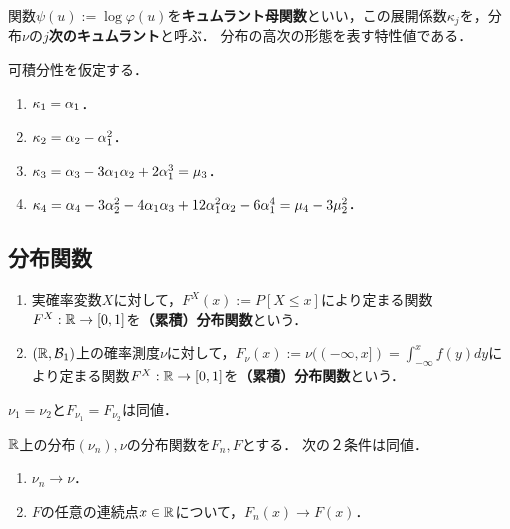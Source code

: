 \documentclass[uplatex,dvipdfmx]{jsreport}
\begin{document}
\begin{definition}[cuumulant]
    関数$\psi(u):=\log\varphi(u)$を\textbf{キュムラント母関数}といい，この展開係数$\kappa_j$を，分布$\nu$の\textbf{$j$次のキュムラント}と呼ぶ．
    分布の高次の形態を表す特性値である．
\end{definition}

\begin{proposition}[キュムラントの積率による表現]
    可積分性を仮定する．
    \begin{enumerate}
        \item $\kappa_1=\alpha_1$．
        \item $\kappa_2=\alpha_2-\alpha_1^2$．
        \item $\kappa_3=\alpha_3-3\alpha_1\alpha_2+2\alpha_1^3=\mu_3$．
        \item $\kappa_4=\alpha_4-3\alpha_2^2-4\alpha_1\alpha_3+12\alpha_1^2\alpha_2-6\alpha_1^4=\mu_4-3\mu_2^2$．
    \end{enumerate}
\end{proposition}

\subsection{分布関数}

\begin{definition}\mbox{}
    \begin{enumerate}
        \item 実確率変数$X$に対して，$F^X(x):=P[X\le x]$により定まる関数$F^X:\mathbb{R}\to[0,1]$を\textbf{（累積）分布関数}という．
        \item $(\mathbb{R},\mathcal{B}_1)$上の確率測度$\nu$に対して，$F_\nu(x):=\nu((-\infty,x])=\int^x_{-\infty}f(y)dy$により定まる関数$F^X:\mathbb{R}\to[0,1]$を\textbf{（累積）分布関数}という．
    \end{enumerate}
\end{definition}

\begin{proposition}
    $\nu_1=\nu_2$と$F_{\nu_1}=F_{\nu_2}$は同値．
\end{proposition}

\begin{proposition}
    $\mathbb{R}$上の分布$(\nu_n),\nu$の分布関数を$F_n,F$とする．
    次の２条件は同値．
    \begin{enumerate}
        \item $\nu_n\to\nu$．
        \item $F$の任意の連続点$x\in\mathbb{R}$について，$F_n(x)\to F(x)$．
    \end{enumerate}
\end{proposition}
\end{document}

